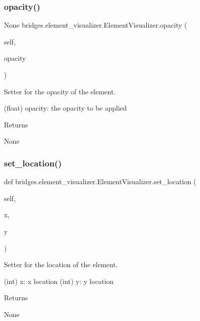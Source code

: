 \subsubsection{\texorpdfstring{opacity()}{opacity()}\hspace{0.1cm}{\footnotesize\ttfamily [2/2]}}
{\footnotesize\ttfamily  None bridges.\+element\+\_\+visualizer.\+Element\+Visualizer.\+opacity (\begin{DoxyParamCaption}\item[{}]{self,  }\item[{}]{opacity }\end{DoxyParamCaption})}



Setter for the opacity of the element. 

\begin{DoxyVerb}       (float) opacity: the opacity to be applied
\end{DoxyVerb}
 \begin{DoxyReturn}{Returns}


None 
\end{DoxyReturn}
\mbox{\label{classbridges_1_1element__visualizer_1_1_element_visualizer_a7aef4402f2de7e88a3260bbec3a708a7}} 
\subsubsection{\texorpdfstring{set\_location()}{set\_location()}}
{\footnotesize\ttfamily def bridges.\+element\+\_\+visualizer.\+Element\+Visualizer.\+set\+\_\+location (\begin{DoxyParamCaption}\item[{}]{self,  }\item[{}]{x,  }\item[{}]{y }\end{DoxyParamCaption})}



Setter for the location of the element. 

\begin{DoxyVerb}       (int) x: x location
       (int) y: y location
\end{DoxyVerb}
 \begin{DoxyReturn}{Returns}


None 
\end{DoxyReturn}
\mbox{\label{classbridges_1_1element__visualizer_1_1_element_visualizer_a1a776963fc8564f010767457d5ea9118}} 
